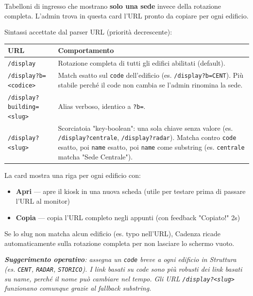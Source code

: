 \documentclass[11pt,a4paper]{article}
\renewenvironment{quote}
  {\begin{list}{}{%
      \setlength{\leftmargin}{8pt}%
      \setlength{\rightmargin}{8pt}%
      \setlength{\topsep}{6pt}%
      \setlength{\parsep}{0pt}}%
      \item\relax\color{black!75}\itshape}
  {\end{list}}
\begin{document}
Tabelloni di ingresso che mostrano \textbf{solo una sede} invece della rotazione completa. L'admin trova in questa card l'URL pronto da copiare per ogni edificio.

Sintassi accettate dal parser URL (priorità decrescente):

\begin{table}[H]
\centering
\small
\begin{tabularx}{\linewidth}{|X|X|}
\hline
\rowcolor{tableheader} URL & Comportamento \\
\hline
\texttt{/display} & Rotazione completa di tutti gli edifici abilitati (default). \\
\hline
\texttt{/display?b=\textless{}codice\textgreater{}} & Match esatto sul \texttt{code} dell'edificio (es. \texttt{/display?b=CENT}). Più stabile perché il code non cambia se l'admin rinomina la sede. \\
\hline
\texttt{/display?building=\textless{}slug\textgreater{}} & Alias verboso, identico a \texttt{?b=}. \\
\hline
\texttt{/display?\textless{}slug\textgreater{}} & Scorciatoia "key-boolean": una sola chiave senza valore (es. \texttt{/display?centrale}, \texttt{/display?radar}). Matcha contro \texttt{code} esatto, poi \texttt{name} esatto, poi \texttt{name} come substring (es. \texttt{centrale} matcha "Sede Centrale"). \\
\hline
\end{tabularx}
\end{table}


La card mostra una riga per ogni edificio con:
\begin{itemize}
  \item \textbf{Apri} --- apre il kiosk in una nuova scheda (utile per testare prima di passare l'URL al monitor)
  \item \textbf{Copia} --- copia l'URL completo negli appunti (con feedback "Copiato!" 2s)
\end{itemize}

Se lo slug non matcha alcun edificio (es. typo nell'URL), Cadenza ricade automaticamente sulla rotazione completa per non lasciare lo schermo vuoto.

\begin{quote}
\textbf{Suggerimento operativo}: assegna un \texttt{code} breve a ogni edificio in Struttura (es. \texttt{CENT}, \texttt{RADAR}, \texttt{STORICO}). I link basati su code sono più robusti dei link basati su name, perché il nome può cambiare nel tempo. Gli URL \texttt{/display?\textless{}slug\textgreater{}} funzionano comunque grazie al fallback substring.
\end{quote}
\end{document}
